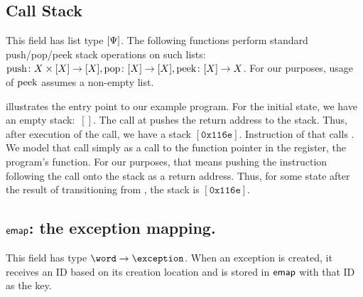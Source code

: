 \subsection{Call Stack}
This field has list type $[\pointer]$.
The following functions perform standard push/pop/peek stack operations on such lists:
\(
\operatorname{push}\colon X\times[X]\to[X],
\operatorname{pop}\colon[X]\to[X],
\operatorname{peek}\colon[X]\to X
\).
For our purposes, usage of $\operatorname{peek}$ assumes a non-empty list. %
\begin{example}
   illustrates the entry point to our example program.
  For the initial state, we have an empty stack:~$[]$.
  The call at  pushes the return address to the stack.
  Thus, after execution of the call, we have a stack $[\mathtt{0x116e}]$.
  Instruction  of that  calls .
  We model that call simply as a call to the function pointer in the  register, the program's  function.
  For our purposes, that means pushing the instruction following the call onto the stack as a return address.
  Thus, for some state after the result of transitioning from , the stack is $[\mathtt{0x116e}]$.
\end{example}

\subsection{$\operatorname{\mathsf{emap}}$: the exception mapping.}
This field has type $\word\to\exception$.
When an exception is created, it receives an ID based on its creation location and is stored in $\operatorname{\mathsf{emap}}$ with that ID as the key.

